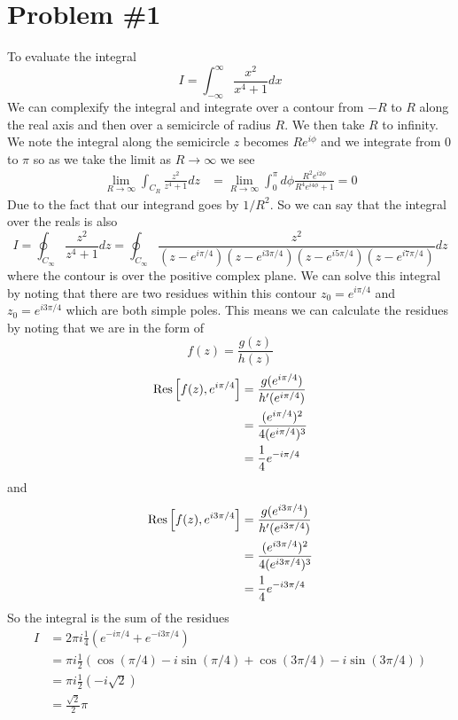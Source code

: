 \documentclass[11pt]{article}
\numberwithin{equation}{section}
\begin{document}


\section{Problem \#1}
To evaluate the integral
$$I = \int_{-\infty}^{\infty}\frac{x^2}{x^4+1}dx$$
We can complexify the integral and integrate over a contour from $-R$ to $R$ along the real
axis and then over a semicircle of radius $R$. We then take $R$ to infinity. We note the 
integral along the semicircle $z$ becomes $Re^{i\phi}$ and we integrate from $0$ to $\pi$ so
as we take the limit as $R\rightarrow\infty$ we see
\begin{align*}
\lim_{R\rightarrow\infty}\int_{C_R}\frac{z^2}{z^4+1}dz &= \lim_{R\rightarrow\infty}\int_{0}^{\pi}d\phi\frac{R^2e^{i2\phi}}{R^4e^{i4\phi}+1} = 0
\end{align*}
Due to the fact that our integrand goes by $1/R^2$. So we can say that the integral over the
reals is also
$$I = \oint_{C_{\infty}}\frac{z^2}{z^4+1}dz = \oint_{C_{\infty}}\frac{z^2}{(z-e^{i\pi/4})(z-e^{i3\pi/4})(z-e^{i5\pi/4})(z-e^{i7\pi/4})}dz$$
where the contour is over the positive complex plane. We can solve this integral by noting 
that there are two residues within this contour $z_0=e^{i\pi/4}$ and $z_0=e^{i3\pi/4}$ which are
both simple poles. This means we can calculate the residues by noting that we are in the form
of 
$$f(z) = \frac{g(z)}{h(z)}$$
\begin{align*}
\textnormal{Res}\left[{f(z)},{e^{i\pi/4}}\right] &= \frac{g(e^{i\pi/4})}{h'(e^{i\pi/4})}\\
&= \frac{(e^{i\pi/4})^2}{4(e^{i\pi/4})^3}\\
&= \frac{1}{4}e^{-i\pi/4} 
\end{align*}
and
\begin{align*}
\textnormal{Res}\left[{f(z)},{e^{i3\pi/4}}\right] &= \frac{g(e^{i3\pi/4})}{h'(e^{i3\pi/4})}\\
&= \frac{(e^{i3\pi/4})^2}{4(e^{i3\pi/4})^3}\\
&= \frac{1}{4}e^{-i3\pi/4}
\end{align*}
So the integral is the sum of the residues 
\begin{align*}
I &= 2\pi{i}\frac{1}{4}\left(e^{-i\pi/4}+e^{-i3\pi/4}\right)\\
&= \pi{i}\frac{1}{2}\left(\cos(\pi/4)-i\sin(\pi/4) + \cos(3\pi/4) - i\sin(3\pi/4)\right)\\
&= \pi{i}\frac{1}{2}\left(-i\sqrt{2}\right)\\
&= \frac{\sqrt{2}}{2}\pi
\end{align*}
\end{document}
